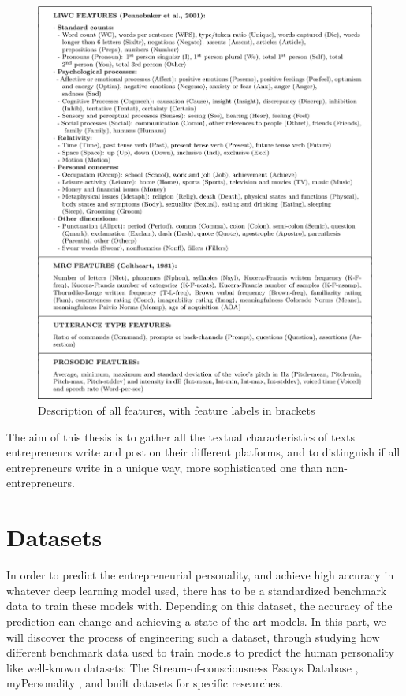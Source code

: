 \begin{figure}[H]
\centering
\includegraphics[width=16cm]{LIWC}
\caption{Description of all features, with feature labels in brackets\cite{mairesse2007using}}
\label{fig:featuresALL}
\end{figure}

The aim of this thesis is to gather all the textual characteristics of texts entrepreneurs write and post on their different platforms, and to distinguish if all entrepreneurs write in a unique way, more sophisticated one than non-entrepreneurs.

\section{Datasets}
In order to predict the entrepreneurial personality, and achieve high accuracy in whatever deep learning model used, there has to be a standardized benchmark data to train these models with. Depending on this dataset, the accuracy of the prediction can change and achieving a state-of-the-art models. In this part, we will discover the process of engineering such a dataset, through studying how different benchmark data used to train models to predict the human personality like well-known datasets: The Stream-of-consciousness Essays Database \cite{pennebaker1999linguistic}, myPersonality \cite{kosinski2015facebook}, and built datasets for specific researches.

